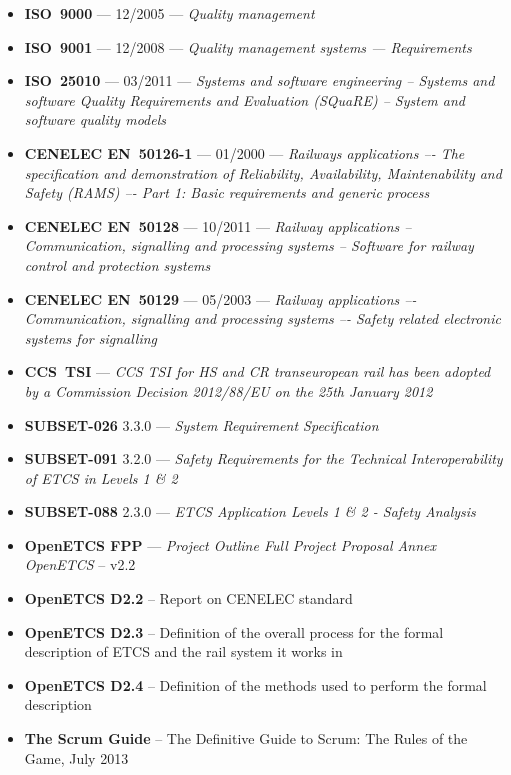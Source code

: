 \begin{itemize}
\item \textbf{ISO~9000} --- 12/2005 --- \emph{Quality management}
\item \textbf{ISO~9001} --- 12/2008 --- \emph{Quality management systems — Requirements}
\item \textbf{ISO~25010} --- 03/2011 --- \emph{Systems and software engineering -- Systems and software Quality Requirements and Evaluation (SQuaRE) -- System and software quality models}
\item \textbf{CENELEC EN~50126-1} --- 01/2000 --- \emph{Railways applications –- The specification and 
demonstration of Reliability, Availability, Maintenability and Safety (RAMS) –- Part 1: 
Basic requirements and generic process}
\item \textbf{CENELEC EN~50128} --- 10/2011 --- \emph{Railway applications -- Communication, signalling and 
processing systems -- Software for railway control and protection systems}
\item \textbf{CENELEC EN~50129} --- 05/2003 --- \emph{Railway applications –- Communication, signalling and 
processing systems –- Safety related electronic systems for signalling}
\item \textbf{CCS~TSI} --- \emph{ CCS TSI for HS and CR transeuropean rail has been adopted by a Commission Decision 2012/88/EU on the 25th January 2012}
\item \textbf{SUBSET-026} 3.3.0 --- \emph{System Requirement Specification}
\item \textbf{SUBSET-091} 3.2.0 --- \emph{Safety Requirements for the Technical Interoperability
of ETCS in Levels 1 \& 2}
\item \textbf{SUBSET-088} 2.3.0 --- \emph{ETCS Application Levels 1 \& 2 - Safety Analysis}
\item \textbf{OpenETCS FPP} --- \emph{Project Outline Full Project Proposal Annex OpenETCS} -- v2.2
\item \textbf{OpenETCS D2.2} -- Report on CENELEC standard
\item \textbf{OpenETCS D2.3} -- Definition of the overall process for the formal description of ETCS and the rail system it works in 
\item \textbf{OpenETCS D2.4} -- Definition of the methods used to perform the formal description
\item \textbf{The Scrum Guide} -- The Definitive Guide to Scrum: The Rules of the Game, July 2013
\end{itemize}


